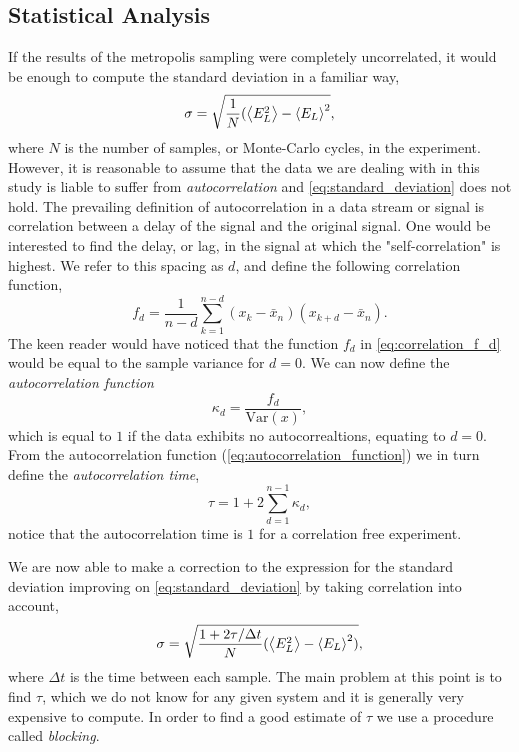 \documentclass[
    a4paper, aps, twocolumn, floatfix, superscriptaddress,
    nofootinbib]{revtex4-1}
\newcommand{\1}{\mathds{1}}
\begin{document}
    \subsection{Statistical Analysis}
        If the results of the metropolis sampling were completely uncorrelated,
        it would be enough to compute the standard deviation in a familiar way,
        \begin{equation}
            \sigma = \sqrt{\frac{1}{N}(\ev{E^2_L} - \ev{E_L}^2},
            \label{eq:standard_deviation}
        \end{equation}
        where $N$ is the number of samples, or Monte-Carlo cycles, in the experiment.
        However, it is reasonable to assume that the data we are dealing with in this
        study is liable to suffer from \emph{autocorrelation} and \autoref{eq:standard_deviation}
        does not hold. The prevailing
        definition of autocorrelation in a data stream or signal is correlation
        between a delay of the signal and the original signal. One would be interested to find the
        delay, or lag, in the signal at which the "self-correlation" is highest. We refer to this
        spacing as $d$, and define the following correlation function,
        \begin{equation}
            f_d = \frac{1}{n -d} \sum_{k=1}^{n-d} (x_k - \bar{x}_n)(x_{k+d} - \bar{x}_n).
            \label{eq:correlation_f_d}
        \end{equation}
        The keen reader would have noticed that the function $f_d$ in \autoref{eq:correlation_f_d}
        would be equal to the sample variance for $d=0$. We can now define the \emph{autocorrelation function}
        \begin{equation}
            \kappa_d = \frac{f_d}{\text{Var}(x)},
            \label{eq:autocorrelation_function}
        \end{equation}
        which is equal to $1$ if the data exhibits no autocorrealtions, equating to $d=0$. From the autocorrelation
        function (\ref{eq:autocorrelation_function}) we in turn define the \emph{autocorrelation time},
        \begin{equation}
            \tau = 1 + 2 \sum_{d=1}^{n-1}\kappa_d,
        \end{equation}
        notice that the autocorrelation time is $1$ for a correlation free experiment.

        We are now able to make a correction to the expression for the standard deviation
        improving on \autoref{eq:standard_deviation} by taking correlation into account,
        \begin{equation}
            \sigma =\sqrt{\frac{1 + 2\tau / \Delta t}{N}(\ev{E^2_L} - \ev{E_L}^2)},
        \end{equation}
        where $\Delta t$ is the time between each sample. The main problem at this point is to
        find $\tau$, which we do not know for any given system and it is generally very expensive to
        compute. In order to find a good estimate of $\tau$ we use a procedure called \emph{blocking}.
\end{document}
